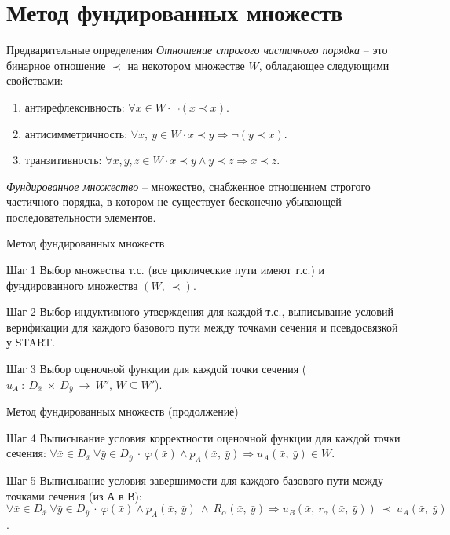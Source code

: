 \documentclass[hyperref={unicode=true}]{beamer}
\begin{document}
    \section{Метод фундированных множеств}

    \begin{frame}{Предварительные определения}
	\emph{Отношение строгого частичного порядка} -- это бинарное отношение $\prec$ на некотором множестве $W$, обладающее следующими свойствами:
    \begin{enumerate}
    \item антирефлексивность: $\forall x \in W \cdot \neg (x \prec x)$.
    \item антисимметричность: $\forall x,~y \in W \cdot x \prec y \Rightarrow \neg (y \prec x)$.
    \item транзитивность: $\forall x, y, z \in W \cdot x \prec y \land y \prec z \Rightarrow x \prec z$.
    \end{enumerate}

    \emph{Фундированное множество} -- множество, снабженное отношением строгого частичного порядка, в котором не существует бесконечно убывающей последовательности элементов.
    \end{frame}

	\begin{frame}{Метод фундированных множеств}

    \begin{block}{Шаг 1}
	Выбор множества т.с. (все циклические пути имеют т.с.) и фундированного множества $(W,~\prec)$.
	\end{block}
	\begin{block}{Шаг 2}
	Выбор индуктивного утверждения для каждой т.с., выписывание условий верификации для каждого
	базового пути между точками сечения и псевдосвязкой у START.
	\end{block}
	\begin{block}{Шаг 3}
	Выбор оценочной функции для каждой точки сечения ($u_A~:~D_{\bar{x}}~\times~D_{\bar{y}}~\rightarrow~W'$, $W \subseteq W'$).
	\end{block}
	\end{frame}

	\begin{frame}{Метод фундированных множеств (продолжение)}

	\begin{block}{Шаг 4}
	Выписывание условия корректности оценочной функции для каждой точки сечения:
	$\forall \bar{x} \in D_{\bar{x}} ~\forall \bar{y} \in D_{\bar{y}} ~\cdot~
	\varphi(\bar{x}) \land p_A(\bar{x},~\bar{y}) \Rightarrow u_A(\bar{x},~\bar{y}) \in W$.
	\end{block}
	\begin{block}{Шаг 5}
	Выписывание условия завершимости для каждого базового пути между точками сечения (из А в В):
	$\forall \bar{x} \in D_{\bar{x}} ~ \forall \bar{y} \in D_{\bar{y}} ~\cdot~
	\varphi(\bar{x}) \land p_A(\bar{x},~\bar{y})~\land~R_\alpha(\bar{x},~\bar{y}) \Rightarrow
	u_B(\bar{x},~r_\alpha(\bar{x},~\bar{y})) ~\prec~ u_A(\bar{x},~\bar{y})$.
	\end{block}
	\end{frame}
\end{document}
